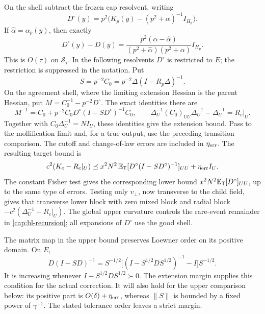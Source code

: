On the shell subtract the frozen cap resolvent, writing
\[
 D^\circ(y)=p^2\bigl(K_p(y)-(p^2+\alpha)^{-1}I_{H_p}\bigr).
\]
If \(\widehat\alpha=\alpha_p(y)\), then exactly
\[
 D^\circ(y)-D(y)
 =\frac{p^2(\alpha-\widehat\alpha)}
        {(p^2+\widehat\alpha)(p^2+\alpha)}I_{H_p}.
\]
This is \(O(\tau)\) on \(\mathcal S_\tau\). In the following resolvents
\(D^\circ\) is restricted to \(E\); the restriction is suppressed in the
notation. Put
\[
 S=p^{-2}C_0=p^{-2}\Delta(I-R_p\Delta)^{-1}.
\]
On the agreement shell, where the limiting extension Hessian is the parent
Hessian, put \(M=C_0^{-1}-p^{-2}D^\circ\). The exact identities there are
\[
 M^{-1}=C_0+p^{-2}C_0D^\circ(I-SD^\circ)^{-1}C_0,\qquad
 \Delta_U^{-1}(C_0)_{UU}\Delta_U^{-1}-\Delta_U^{-1}=R_c|_U.
\]
Together with \(C_0\Delta_U^{-1}=N I_U\), these identities give the
extension bound. Pass to the mollification limit and, for a true output,
use the preceding transition comparison. The cutoff and change-of-law
errors are included in \(\eta_{\rm err}\). The resulting target bound is
\begin{equation}\label{cap:bl-recursion}
 c^2(K_c-R_c|_U)
 \preceq x^2N^2\,\mathbb E_{\mathsf T}
       [D^\circ(I-SD^\circ)^{-1}]_{UU}
       +\eta_{\rm err}I_U .
\end{equation}
The constant Fisher test gives the
corresponding lower bound \(x^2N^2\mathbb E_{\mathsf T}[D^\circ]_{UU}\), up to the
same type of errors. Testing only \(v_\perp\), now transverse to the child
field, gives that transverse lower block with zero mixed block and radial
block \(-c^2(\Delta_U^{-1}+R_c|_U)\). The global upper curvature controls
the rare-event remainder in \eqref{cap:bl-recursion}; all expansions of
\(D^\circ\) use the good shell.

The matrix map in the upper bound preserves Loewner order on its positive
domain. On \(E\),
\begin{equation}\label{cap:resolvent-order}
 D(I-SD)^{-1}
 =S^{-1/2}\bigl[(I-S^{1/2}DS^{1/2})^{-1}-I\bigr]S^{-1/2}.
\end{equation}
It is increasing whenever \(I-S^{1/2}DS^{1/2}\succ0\). The extension
margin supplies this condition for the actual correction. It will also hold
for the upper comparison below: its positive part is \(O(\delta)+
\eta_{\rm err}\), whereas \(\|S\|\) is bounded by a fixed power of
\(\gamma^{-1}\). The stated tolerance order leaves a strict margin.

